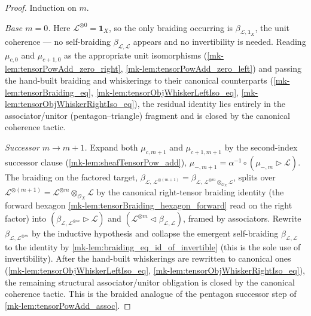 \begin{proof}
  \leanok
    Induction on \(m\).

  \emph{Base \(m = 0\).} Here \(\mathcal{L}^{\otimes 0} = \mathbf{1}_X\), so the
  only braiding occurring is \(\beta_{\mathcal{L},\mathbf{1}_X}\), the unit
  coherence --- no self-braiding \(\beta_{\mathcal{L},\mathcal{L}}\) appears and
  no invertibility is needed. Reading \(\mu_{c,0}\) and \(\mu_{c+1,0}\) as the
  appropriate unit isomorphisms (\ref{mk-lem:tensorPowAdd_zero_right},
  \ref{mk-lem:tensorPowAdd_zero_left}) and passing the hand-built braiding and
  whiskerings to their canonical counterparts (\ref{mk-lem:tensorBraiding_eq},
  \ref{mk-lem:tensorObjWhiskerLeftIso_eq}, \ref{mk-lem:tensorObjWhiskerRightIso_eq}),
  the residual identity lies entirely in the associator/unitor
  (pentagon--triangle) fragment and is closed by the canonical coherence tactic.

  \emph{Successor \(m \to m+1\).} Expand both \(\mu_{c,m+1}\) and
  \(\mu_{c+1,m+1}\) by the second-index successor clause
  (\ref{mk-lem:sheafTensorPow_add}), \(\mu_{-,m+1} = \alpha^{-1}\circ(\mu_{-,m}
  \rhd\mathcal{L})\). The braiding on the factored target,
  \(\beta_{\mathcal{L},\,\mathcal{L}^{\otimes(m+1)}} =
  \beta_{\mathcal{L},\,\mathcal{L}^{\otimes m}\otimes_{\mathcal{O}_X}\mathcal{L}}\),
  splits over \(\mathcal{L}^{\otimes(m+1)} = \mathcal{L}^{\otimes m}
  \otimes_{\mathcal{O}_X}\mathcal{L}\) by the canonical right-tensor braiding
  identity (the forward hexagon \ref{mk-lem:tensorBraiding_hexagon_forward} read on
  the right factor) into \((\beta_{\mathcal{L},\mathcal{L}^{\otimes m}}\rhd
  \mathcal{L})\) and \((\mathcal{L}^{\otimes m}\lhd\beta_{\mathcal{L},\mathcal{L}})\),
  framed by associators. Rewrite \(\beta_{\mathcal{L},\mathcal{L}^{\otimes m}}\) by
  the inductive hypothesis and collapse the emergent self-braiding
  \(\beta_{\mathcal{L},\mathcal{L}}\) to the identity by
  \ref{mk-lem:braiding_eq_id_of_invertible} (this is the sole use of
  invertibility). After the hand-built whiskerings are rewritten to canonical ones
  (\ref{mk-lem:tensorObjWhiskerLeftIso_eq},
  \ref{mk-lem:tensorObjWhiskerRightIso_eq}), the remaining structural
  associator/unitor obligation is closed by the canonical coherence tactic. This
  is the braided analogue of the pentagon successor step of
  \ref{mk-lem:tensorPowAdd_assoc}.
\end{proof}

